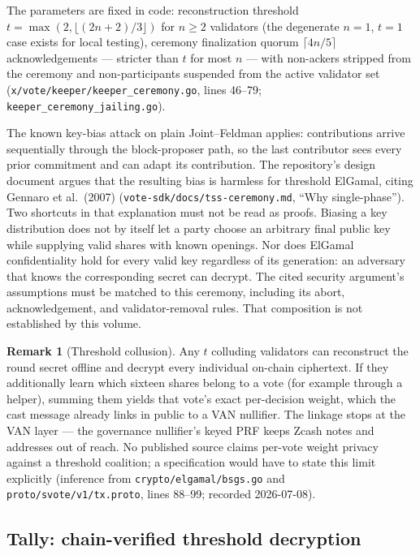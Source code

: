 \documentclass[11pt,a4paper]{article}
\theoremstyle{definition}
\newtheorem{remark}[theorem]{Remark}
\begin{document}
The parameters are fixed in code: reconstruction threshold
$t = \max(2, \lfloor (2n+2)/3 \rfloor)$ for $n \geq 2$ validators (the
degenerate $n = 1$, $t = 1$ case exists for local testing), ceremony
finalization quorum $\lceil 4n/5 \rceil$ acknowledgements --- stricter than
$t$ for most $n$ --- with non-ackers stripped from the ceremony and
non-participants suspended from the active validator set
(\texttt{x/vote/keeper/keeper\_ceremony.go}, lines 46--79;
\texttt{keeper\_ceremony\_jailing.go}).

The known key-bias attack on plain Joint--Feldman applies: contributions
arrive sequentially through the block-proposer path, so the last
contributor sees every prior commitment and can adapt its contribution.
The repository's design document argues that the resulting bias is
harmless for threshold ElGamal, citing Gennaro et al.\ (2007)
(\texttt{vote-sdk/docs/tss-ceremony.md}, ``Why single-phase''). Two
shortcuts in that explanation must not be read as proofs. Biasing a key
distribution does not by itself let a party choose an arbitrary final
public key while supplying valid shares with known openings. Nor does
ElGamal confidentiality hold for every valid key regardless of its
generation: an adversary that knows the corresponding secret can decrypt.
The cited security argument's assumptions must be matched to this
ceremony, including its abort, acknowledgement, and validator-removal
rules. That composition is not established by this volume.

\begin{remark}[Threshold collusion]\label{rem:vote-ea-collusion}
Any $t$ colluding validators can reconstruct the round secret offline and
decrypt every individual on-chain ciphertext. If they additionally learn
which sixteen shares belong to a vote (for example through a helper),
summing them yields that vote's exact per-decision weight, which the cast
message already links in public to a VAN nullifier. The linkage stops at the
VAN layer --- the governance nullifier's keyed PRF keeps Zcash notes and
addresses out of reach. No published source claims per-vote weight privacy
against a threshold coalition; a specification would have to state this
limit explicitly (inference from \texttt{crypto/elgamal/bsgs.go} and
\texttt{proto/svote/v1/tx.proto}, lines 88--99; recorded 2026-07-08).
\end{remark}

\subsection{Tally: chain-verified threshold decryption}
\label{sec:vote-decrypt}
\end{document}
